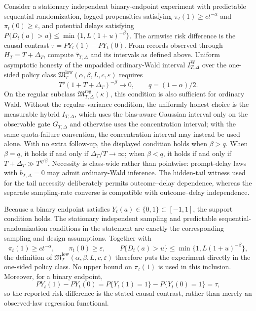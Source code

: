 Consider a stationary independent binary-endpoint experiment with predictable sequential randomization, logged propensities satisfying \(\pi_t(1)\geq ct^{-\alpha}\) and \(\pi_t(0)\geq\varepsilon\), and potential delays satisfying \(P\{D_t(a)>u\}\leq\min\{1,L(1+u)^{-\beta}\}\).  The armwise risk difference is the causal contrast \(\tau=P Y_t(1)-P Y_t(0)\).  From records observed through \(H_T=T+\Delta_T\), compute \(\widehat\tau_{T,\Delta}\) and its intervals as defined above.  Uniform asymptotic honesty of the unpadded ordinary-Wald interval \(I_{T,\Delta}^{\mathrm W}\) over the one-sided policy class \(\mathfrak M_T^{\mathrm{low}}(\alpha,\beta,L,c,\varepsilon)\) requires
\[
 T^q(1+T+\Delta_T)^{-\beta}\longrightarrow0,
 \qquad q=(1-\alpha)/2.
\]
On the regular subclass \(\mathfrak M_{T,\Delta}^{\mathrm{reg}}(\kappa)\), this condition is also sufficient for ordinary Wald.  Without the regular-variance condition, the uniformly honest choice is the measurable hybrid \(I_{T,\Delta}\), which uses the bias-aware Gaussian interval only on the observable gate \(G_{T,\Delta}\) and otherwise uses the concentration interval; with the same quota-failure convention, the concentration interval may instead be used alone.  With no extra follow-up, the displayed condition holds when \(\beta>q\).  When \(\beta=q\), it holds if and only if \(\Delta_T/T\to\infty\); when \(\beta<q\), it holds if and only if \(T+\Delta_T\gg T^{q/\beta}\).  Necessity is class-wide rather than pointwise: prompt-delay laws with \(b_{T,\Delta}=0\) may admit ordinary-Wald inference.  The hidden-tail witness used for the tail necessity deliberately permits outcome--delay dependence, whereas the separate sampling-rate converse is compatible with outcome--delay independence.

Because a binary endpoint satisfies \(Y_t(a)\in\{0,1\}\subset[-1,1]\), the support condition holds.  The stationary independent sampling and predictable sequential-randomization conditions in the statement are exactly the corresponding sampling and design assumptions.  Together with
\[
 \pi_t(1)\geq ct^{-\alpha},\qquad \pi_t(0)\geq\varepsilon,
 \qquad
 P\{D_t(a)>u\}\leq\min\{1,L(1+u)^{-\beta}\},
 \tag{1}
\]
the definition of \(\mathfrak M_T^{\mathrm{low}}(\alpha,\beta,L,c,\varepsilon)\) therefore puts the experiment directly in the one-sided policy class.  No upper bound on \(\pi_t(1)\) is used in this inclusion.  Moreover, for a binary endpoint,
\[
 P Y_t(1)-P Y_t(0)
 =P\{Y_t(1)=1\}-P\{Y_t(0)=1\}=\tau,
 \tag{2}
\]
so the reported risk difference is the stated causal contrast, rather than merely an observed-law regression functional.

